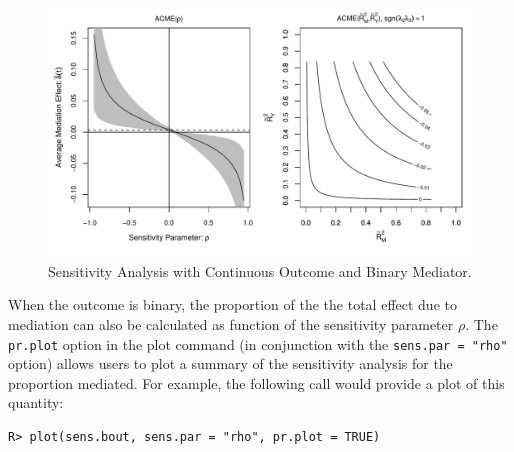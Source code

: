 \documentclass[11pt,letterpaper]{article}
\theoremstyle{plain}
\begin{document}
\begin{figure}[t]
\vspace{-.5in}
\begin{center}
\includegraphics[scale=.8]{Rho-R2-JobsBinOutcome.pdf}
\end{center}
\vspace{-.5in}
\caption{Sensitivity Analysis with Continuous Outcome and Binary Mediator.
  \label{SensBinOut}}
\end{figure}

When the outcome is binary, the proportion of the the total effect due to
mediation can also be calculated as function of the sensitivity parameter $\rho$.
The \texttt{pr.plot} option in the plot command (in conjunction with the 
\texttt{sens.par = "rho"} option) allows users to plot a summary
of the sensitivity analysis for the proportion mediated. For example, the
following call would provide a plot of this quantity:
\begin{verbatim}
R> plot(sens.bout, sens.par = "rho", pr.plot = TRUE)
\end{verbatim}
\end{document}
